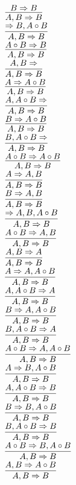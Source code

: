 \documentclass[11pt]{article}
\begin{document}
\begin{center}
\bigskip
\\$\infer{A, B\Rightarrow B}{B\Rightarrow B}$
\bigskip
\\$\infer{A, B\Rightarrow B}{\Rightarrow B, A\circ B}$
\bigskip
\\$\infer{A, B\Rightarrow B}{A\circ B\Rightarrow B}$
\bigskip
\\$\infer{A, B\Rightarrow B}{A, B\Rightarrow }$
\bigskip
\\$\infer{A, B\Rightarrow B}{A\Rightarrow A\circ B}$
\bigskip
\\$\infer{A, B\Rightarrow B}{A, A\circ B\Rightarrow }$
\bigskip
\\$\infer{A, B\Rightarrow B}{B\Rightarrow A\circ B}$
\bigskip
\\$\infer{A, B\Rightarrow B}{B, A\circ B\Rightarrow }$
\bigskip
\\$\infer{A, B\Rightarrow B}{A\circ B\Rightarrow A\circ B}$
\bigskip
\\$\infer{A, B\Rightarrow B}{A\Rightarrow A, B}$
\bigskip
\\$\infer{A, B\Rightarrow B}{B\Rightarrow A, B}$
\bigskip
\\$\infer{A, B\Rightarrow B}{\Rightarrow A, B, A\circ B}$
\bigskip
\\$\infer{A, B\Rightarrow B}{A\circ B\Rightarrow A, B}$
\bigskip
\\$\infer{A, B\Rightarrow B}{A, B\Rightarrow A}$
\bigskip
\\$\infer{A, B\Rightarrow B}{A\Rightarrow A, A\circ B}$
\bigskip
\\$\infer{A, B\Rightarrow B}{A, A\circ B\Rightarrow A}$
\bigskip
\\$\infer{A, B\Rightarrow B}{B\Rightarrow A, A\circ B}$
\bigskip
\\$\infer{A, B\Rightarrow B}{B, A\circ B\Rightarrow A}$
\bigskip
\\$\infer{A, B\Rightarrow B}{A\circ B\Rightarrow A, A\circ B}$
\bigskip
\\$\infer{A, B\Rightarrow B}{A\Rightarrow B, A\circ B}$
\bigskip
\\$\infer{A, B\Rightarrow B}{A, A\circ B\Rightarrow B}$
\bigskip
\\$\infer{A, B\Rightarrow B}{B\Rightarrow B, A\circ B}$
\bigskip
\\$\infer{A, B\Rightarrow B}{B, A\circ B\Rightarrow B}$
\bigskip
\\$\infer{A, B\Rightarrow B}{A\circ B\Rightarrow B, A\circ B}$
\bigskip
\\$\infer{A, B\Rightarrow B}{A, B\Rightarrow A\circ B}$
\bigskip

\end{center}
\end{document}
